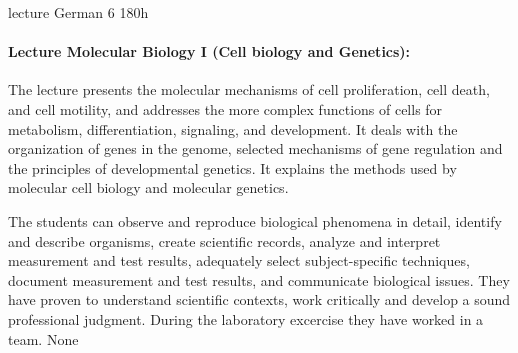 {lecture}
{German}
{6}
{180h}
{\paragraph{Lecture Molecular Biology I (Cell biology and Genetics): } The lecture presents the molecular mechanisms of cell proliferation, cell death, and cell motility, and addresses the more complex functions of cells for metabolism, differentiation, signaling, and development. It deals with the organization of genes in the genome, selected mechanisms of gene regulation and the principles of developmental genetics. It explains the methods used by molecular cell biology and molecular genetics.}
{The students can observe and reproduce biological phenomena in detail, identify and describe organisms, create scientific records, analyze and interpret measurement and test results, adequately select subject-specific techniques, document measurement and test results, and communicate biological issues. They have proven to understand scientific contexts, work critically and develop a sound professional judgment. During the laboratory excercise they have worked in a team.}
{None}